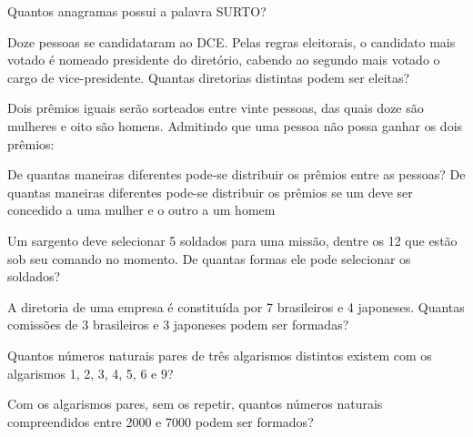 \documentclass[10pt,a4paper]{article}
\begin{document}
\begin{multicols}{2}
    \begin{question}[type=exam]
        Quantos anagramas possui a palavra SURTO?
    \end{question}

    \begin{question}[type=exam]
        Doze pessoas se candidataram ao DCE. Pelas regras eleitorais, o candidato
        mais votado é nomeado presidente do diretório, cabendo ao segundo mais
        votado o cargo de vice-presidente. Quantas diretorias distintas podem
        ser eleitas?
    \end{question}

    \begin{question}[type=exam]
        Dois prêmios iguais serão sorteados entre vinte pessoas, das quais
        doze são mulheres e oito são homens. Admitindo que uma pessoa não possa
        ganhar os dois prêmios:
        \begin{tasks}
            \task De quantas maneiras diferentes pode-se distribuir os prêmios entre as pessoas?
            \task De quantas maneiras diferentes pode-se distribuir os prêmios se
            um deve ser concedido a uma mulher e o outro a um homem
        \end{tasks}
    \end{question}

    \begin{question}[type=exam]
        Um sargento deve selecionar 5 soldados para uma missão, dentre os 12 que estão
        sob seu comando no momento. De quantas formas ele pode selecionar os soldados?
    \end{question}

    \begin{question}[type=exam]
        A diretoria de uma empresa é constituída por 7 brasileiros e 4 japoneses.
        Quantas comissões de 3 brasileiros e 3 japoneses podem ser formadas?
    \end{question}

    \begin{question}[type=exam]
        Quantos números naturais pares de três algarismos distintos existem com os
        algarismos 1, 2, 3, 4, 5, 6 e 9?
    \end{question}

    \begin{question}[type=exam]
        Com os algarismos pares, sem os repetir, quantos números naturais compreendidos
        entre 2000 e 7000 podem ser formados?
    \end{question}


\end{multicols}
\end{document}

